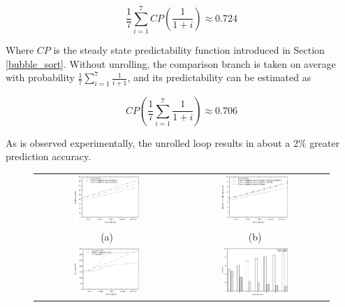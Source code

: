 \documentclass[acmtocl]{acmtrans2m}
\begin{document}
\[
\frac{1}{7}\sum^7_{i=1}CP\left(\frac{1}{1 + i}\right) \approx 0.724
\]

\noindent Where $CP$ is the steady state predictability function introduced in
Section \ref{bubble_sort}.  Without unrolling, the comparison branch is taken on
average with probability $\frac{1}{7}\sum^7_{i=1}\frac{1}{i + 1}$, and its
predictability can be estimated as

\[
CP\left(\frac{1}{7}\sum^7_{i=1}\frac{1}{1 + i} \right) \approx 0.706
\]

\noindent As is observed experimentally, the unrolled loop results in about a
2\% greater prediction accuracy.

\begin{figure}
\centering
\begin{tabular}{cc}
\includegraphics[width=0.48\textwidth]{plots/heapsort_branch_counts.eps} & \includegraphics[width=0.48\textwidth]{plots/heapsort_branch_misses.eps}\\
(a) & (b) \\
\includegraphics[width=0.48\textwidth]{plots/heapsort_cycle_counts.eps} & \includegraphics[width=0.48\textwidth]{plots/heapsort_8heap_branches.eps} \\

\end{tabular}
\end{figure}
\end{document}
